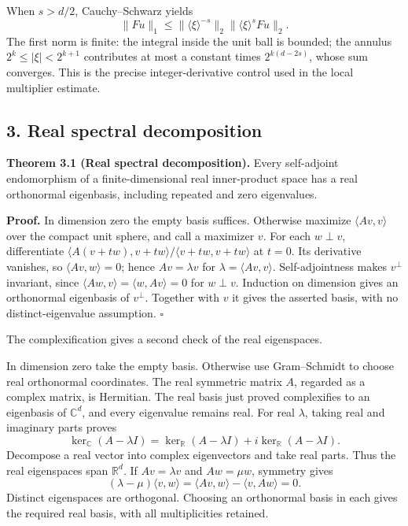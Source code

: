 \documentclass[
  11pt,
]{article}
\begin{document}
When \(s>d/2\), Cauchy--Schwarz yields \[
\|Fu\|_1\leq
\|\langle\xi\rangle^{-s}\|_2
\|\langle\xi\rangle^sFu\|_2.
\] The first norm is finite: the integral inside the unit ball is
bounded; the annulus \(2^k\leq|\xi|<2^{k+1}\) contributes at most a
constant times \(2^{k(d-2s)}\), whose sum converges. This is the precise
integer-derivative control used in the local multiplier estimate.

\subsection{3. Real spectral
decomposition}\label{real-spectral-decomposition}

\textbf{Theorem 3.1 (Real spectral decomposition).} Every self-adjoint
endomorphism of a finite-dimensional real inner-product space has a real
orthonormal eigenbasis, including repeated and zero eigenvalues.

\textbf{Proof.} In dimension zero the empty basis suffices. Otherwise
maximize \(\langle Av,v\rangle\) over the compact unit sphere, and call
a maximizer \(v\). For each \(w\perp v\), differentiate
\(\langle A(v+tw),v+tw\rangle/\langle v+tw,v+tw\rangle\) at \(t=0\). Its
derivative vanishes, so \(\langle Av,w\rangle=0\); hence
\(Av=\lambda v\) for \(\lambda=\langle Av,v\rangle\). Self-adjointness
makes \(v^\perp\) invariant, since
\(\langle Aw,v\rangle=\langle w,Av\rangle=0\) for \(w\perp v\).
Induction on dimension gives an orthonormal eigenbasis of \(v^\perp\).
Together with \(v\) it gives the asserted basis, with no
distinct-eigenvalue assumption. \(\square\)

The complexification gives a second check of the real eigenspaces.

In dimension zero take the empty basis. Otherwise use Gram--Schmidt to
choose real orthonormal coordinates. The real symmetric matrix \(A\),
regarded as a complex matrix, is Hermitian. The real basis just proved
complexifies to an eigenbasis of \(\mathbb C^d\), and every eigenvalue
remains real. For real \(\lambda\), taking real and imaginary parts
proves \[
\ker_{\mathbb C}(A-\lambda I)
=\ker_{\mathbb R}(A-\lambda I)
 +i\ker_{\mathbb R}(A-\lambda I).
\] Decompose a real vector into complex eigenvectors and take real
parts. Thus the real eigenspaces span \(\mathbb R^d\). If
\(Av=\lambda v\) and \(Aw=\mu w\), symmetry gives \[
(\lambda-\mu)\langle v,w\rangle
=\langle Av,w\rangle-\langle v,Aw\rangle=0.
\] Distinct eigenspaces are orthogonal. Choosing an orthonormal basis in
each gives the required real basis, with all multiplicities retained.
\end{document}

